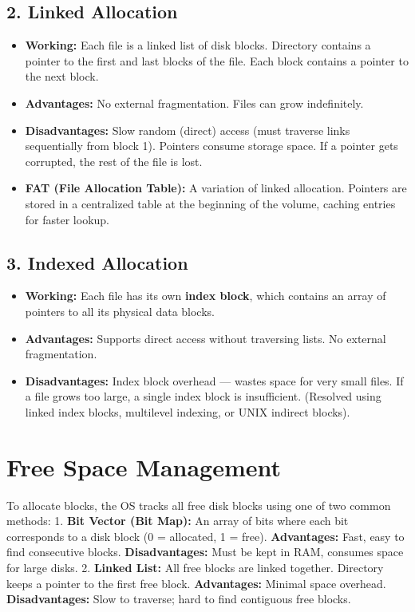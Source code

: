 \documentclass[12pt,a4paper]{article}
\begin{document}
\subsection{2. Linked Allocation}
\begin{itemize}[leftmargin=*, itemsep=3pt]
  \item \textbf{Working:} Each file is a linked list of disk blocks. Directory contains a pointer to the first and last blocks of the file. Each block contains a pointer to the next block.
  \item \textbf{Advantages:} No external fragmentation. Files can grow indefinitely.
  \item \textbf{Disadvantages:} Slow random (direct) access (must traverse links sequentially from block 1). Pointers consume storage space. If a pointer gets corrupted, the rest of the file is lost.
  \item \textbf{FAT (File Allocation Table):} A variation of linked allocation. Pointers are stored in a centralized table at the beginning of the volume, caching entries for faster lookup.
\end{itemize}

\subsection{3. Indexed Allocation}
\begin{itemize}[leftmargin=*, itemsep=3pt]
  \item \textbf{Working:} Each file has its own \textbf{index block}, which contains an array of pointers to all its physical data blocks.
  \item \textbf{Advantages:} Supports direct access without traversing lists. No external fragmentation.
  \item \textbf{Disadvantages:} Index block overhead --- wastes space for very small files. If a file grows too large, a single index block is insufficient. (Resolved using linked index blocks, multilevel indexing, or UNIX indirect blocks).
\end{itemize}

\section{Free Space Management}

To allocate blocks, the OS tracks all free disk blocks using one of two common methods:
1. \textbf{Bit Vector (Bit Map):} An array of bits where each bit corresponds to a disk block (0 = allocated, 1 = free). \textbf{Advantages:} Fast, easy to find consecutive blocks. \textbf{Disadvantages:} Must be kept in RAM, consumes space for large disks.
2. \textbf{Linked List:} All free blocks are linked together. Directory keeps a pointer to the first free block. \textbf{Advantages:} Minimal space overhead. \textbf{Disadvantages:} Slow to traverse; hard to find contiguous free blocks.
\end{document}

